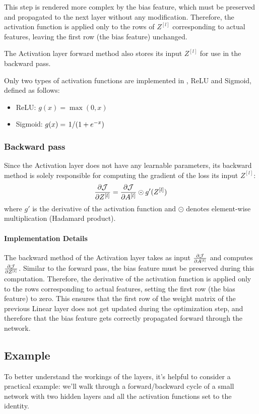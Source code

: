 This step is rendered more complex by the bias feature, which must be preserved and propagated to the next layer without any modification. Therefore, the activation function is applied only to the rows of $Z^{[l]}$ corresponding to actual features, leaving the first row (the bias feature) unchanged.

The Activation layer forward method also stores its input $Z^{[l]}$ for use in the backward pass.

Only two types of activation functions are implemented in \mfnet, ReLU and Sigmoid, defined as follows:
\begin{itemize}
    \item ReLU: $g(x) = \max(0, x)$
    \item Sigmoid: $g(x) = \flatfrac{1}{(1 + e^{-x})}$
\end{itemize}

\subsubsection{Backward pass}
Since the Activation layer does not have any learnable parameters, its backward method is solely responsible for computing the gradient of the loss \wrt its input $Z^{[l]}$:
\begin{equation}
    \pdv{\mathcal{J}}{Z^{[l]}} = \pdv{\mathcal{J}}{A^{[l]}} \odot g'(Z^{[l]})
\end{equation}
where $g'$ is the derivative of the activation function and $\odot$ denotes element-wise multiplication (Hadamard product).

\paragraph{Implementation Details} The backward method of the Activation layer takes as input $\pdv{\mathcal{J}}{A^{[l]}}$ and computes $\pdv{\mathcal{J}}{Z^{[l]}}$. Similar to the forward pass, the bias feature must be preserved during this computation. Therefore, the derivative of the activation function is applied only to the rows corresponding to actual features, setting the first row (the bias feature) to zero. This ensures that the first row of the weight matrix of the previous Linear layer does not get updated during the optimization step, and therefore that the bias feature gets correctly propagated forward through the network.

\subsection{Example}
To better understand the workings of the layers, it's helpful to consider a practical example: we'll walk through a forward/backward cycle of a small network with two hidden layers and all the activation functions set to the identity.

